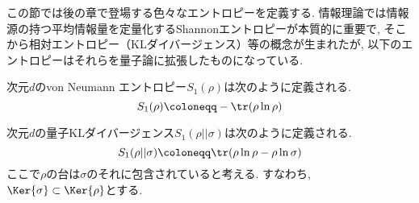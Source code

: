 
この節では後の章で登場する色々なエントロピーを定義する. 
情報理論では情報源の持つ平均情報量を定量化するShannonエントロピーが本質的に重要で, そこから相対エントロピー（KLダイバージェンス）等の概念が生まれたが, 以下のエントロピーはそれらを量子論に拡張したものになっている. 

\begin{mydfn}\label{dfn.vonNeumannEntropy}
  次元$d$のvon Neumann エントロピー$S_1(\rho)$は次のように定義される. 
  \begin{equation}
    S_1(\rho)\coloneqq -\tr(\rho\ln{\rho})
  \end{equation}
\end{mydfn}

\begin{mydfn}[量子KLダイバージェンス]\label{dfn.KLdiv}
  次元$d$の量子KLダイバージェンス$S_1(\rho||\sigma)$は次のように定義される. 
  \begin{equation}
    S_1(\rho||\sigma)\coloneqq \tr(\rho\ln{\rho}-\rho\ln{\sigma})
  \end{equation}
  ここで$\rho$の台は$\sigma$のそれに包含されていると考える. 
  すなわち, $\Ker{\sigma}\subset \Ker{\rho}$とする.
\end{mydfn}